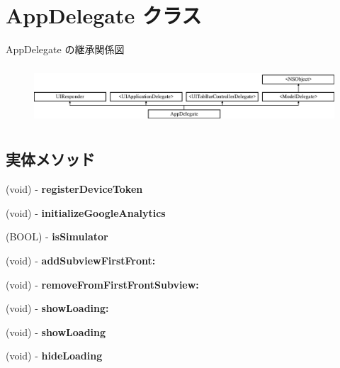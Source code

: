\hypertarget{interface_app_delegate}{}\section{App\+Delegate クラス}
\label{interface_app_delegate}
App\+Delegate の継承関係図\begin{figure}[H]
\begin{center}
\leavevmode
\includegraphics[height=2.187500cm]{interface_app_delegate}
\end{center}
\end{figure}
\subsection*{実体メソッド}
\begin{DoxyCompactItemize}
\item 
\hypertarget{interface_app_delegate_a14969eb12b6b074c8776bfe2d279f1c6}{}(void) -\/ {\bfseries register\+Device\+Token}\label{interface_app_delegate_a14969eb12b6b074c8776bfe2d279f1c6}

\item 
\hypertarget{interface_app_delegate_a236711c7037f82e03fbd1d4e99a96704}{}(void) -\/ {\bfseries initialize\+Google\+Analytics}\label{interface_app_delegate_a236711c7037f82e03fbd1d4e99a96704}

\item 
\hypertarget{interface_app_delegate_a5d509b6b717aedbea00c0ceed5963178}{}(B\+O\+O\+L) -\/ {\bfseries is\+Simulator}\label{interface_app_delegate_a5d509b6b717aedbea00c0ceed5963178}

\item 
\hypertarget{interface_app_delegate_ae9165b28877bcfba54685241f584bd41}{}(void) -\/ {\bfseries add\+Subview\+First\+Front\+:}\label{interface_app_delegate_ae9165b28877bcfba54685241f584bd41}

\item 
\hypertarget{interface_app_delegate_aebb64fd2a653b2831fd3c595b46d1862}{}(void) -\/ {\bfseries remove\+From\+First\+Front\+Subview\+:}\label{interface_app_delegate_aebb64fd2a653b2831fd3c595b46d1862}

\item 
\hypertarget{interface_app_delegate_a2542dd0b734e66277107f3ceafeb3ad6}{}(void) -\/ {\bfseries show\+Loading\+:}\label{interface_app_delegate_a2542dd0b734e66277107f3ceafeb3ad6}

\item 
\hypertarget{interface_app_delegate_ade07b1b843f4fc7b1e2f8d119eaf235e}{}(void) -\/ {\bfseries show\+Loading}\label{interface_app_delegate_ade07b1b843f4fc7b1e2f8d119eaf235e}

\item 
\hypertarget{interface_app_delegate_a9eb28be55244c8705542891f998ac41b}{}(void) -\/ {\bfseries hide\+Loading}\label{interface_app_delegate_a9eb28be55244c8705542891f998ac41b}

\end{DoxyCompactItemize}
